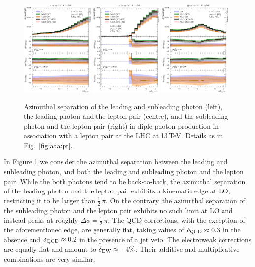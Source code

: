 \begin{figure}[t!]
  \centering
  \includegraphics[width=0.32\textwidth]{figs_aaz/dphi_y1_y2}
  \includegraphics[width=0.32\textwidth]{figs_aaz/dphi_y1_l1l2}
  \includegraphics[width=0.32\textwidth]{figs_aaz/dphi_y2_l1l2}
  \caption{
    Azimuthal separation of the leading and subleading photon (left),
    the leading photon and the lepton pair (centre), and the subleading 
    photon and the lepton pair (right)
    in diple photon production in association with a lepton pair 
    at the LHC at 13\,TeV. 
    Details as in Fig.\ \ref{fig:aaa:pt}.
    \label{fig:aaz:dphi}
  }
\end{figure}

In Figure \ref{fig:aaz:dphi} we consider the azimuthal separation 
between the leading and subleading photon, and both the leading 
and subleading photon and the lepton pair.
While the both photons tend to be back-to-back, the azimuthal 
separation of the leading photon and the lepton pair exhibits 
a kinematic edge at LO, restricting it to be larger than 
$\tfrac{1}{2}\,\pi$. 
On the contrary, the azimuthal separation of the subleading 
photon and the lepton pair exhibits no such limit at LO and 
instead peaks at roughly $\Delta\phi=\tfrac{1}{2}\,\pi$. 
The QCD corrections, with the exception of the aforementioned 
edge, are generally flat, taking values of $\delta_\text{QCD}\approx 0.3$ 
in the absence and $\delta_\text{QCD}\approx 0.2$ in the presence 
of a jet veto. 
The electroweak corrections are equally flat and amount to 
$\delta_\text{EW}\approx-4\%$. 
Their additive and multiplicative combinations are very 
similar.

